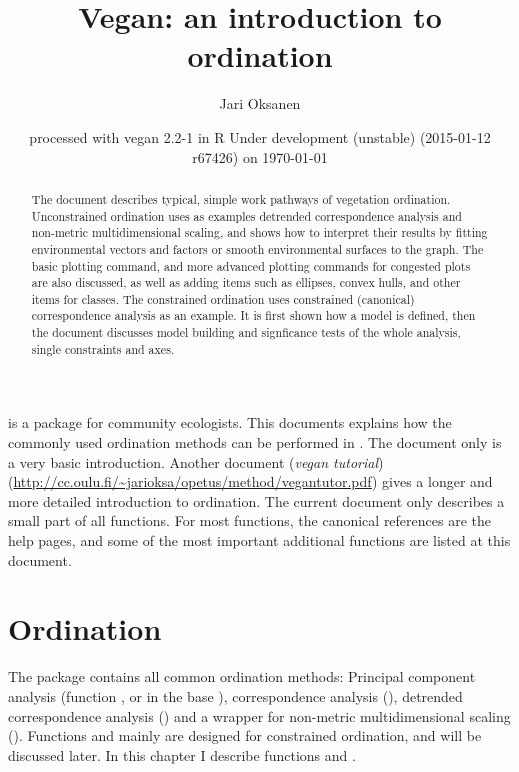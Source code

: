 \documentclass[a4paper,10pt]{article}
\title{Vegan: an introduction to ordination}
\author{Jari Oksanen}
\date{\footnotesize{
  processed with vegan
2.2-1
in R Under development (unstable) (2015-01-12 r67426) on \today}}
\begin{document}
\maketitle
\begin{abstract}
  The document describes typical, simple work pathways of
  vegetation ordination. Unconstrained ordination uses as examples
  detrended correspondence analysis and non-metric multidimensional
  scaling, and shows how to interpret their results by fitting
  environmental vectors and factors or smooth environmental surfaces
  to the graph. The basic plotting command, and more advanced plotting
  commands for congested plots are also discussed, as well as adding
  items such as ellipses, convex hulls, and other items for
  classes. The constrained ordination uses constrained (canonical)
  correspondence analysis as an example. It is first shown how a model
  is defined, then the document discusses model building and
  signficance tests of the whole analysis, single constraints and
  axes.
\end{abstract}
\tableofcontents

\vspace{3ex}
\noindent {} is a package for community ecologists.  This
documents explains how the commonly used ordination methods can be
performed in .  The document only is a very basic
introduction.  Another document (\emph{vegan tutorial})
(\url{http://cc.oulu.fi/~jarioksa/opetus/method/vegantutor.pdf}) gives
a longer and more detailed introduction to ordination.  The
current document only describes a small part of all 
functions.  For most functions, the canonical references are the
 help pages, and some of the most important additional
functions are listed at this document.

\section{Ordination}

The  package contains all common ordination methods:
Principal component analysis (function , or  in
the base ), correspondence analysis (),
detrended correspondence analysis () and a wrapper for
non-metric multidimensional scaling ().  Functions
 and  mainly are designed for constrained
ordination, and will be discussed later.  In this chapter I describe
functions  and .
\end{document}
